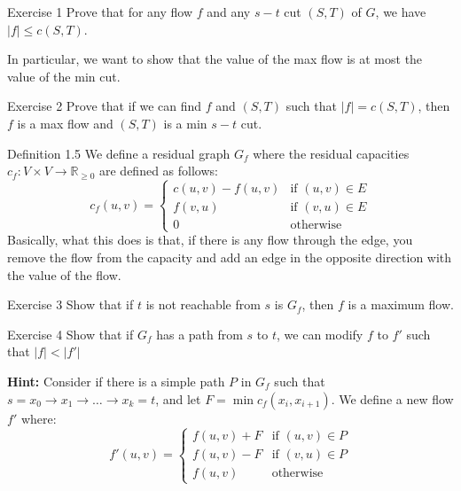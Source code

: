 \documentclass[aspectratio=169]{beamer}
\newcommand{\R}{\mathbb{R}}
\newcommand{\blankslides}{%
  \begin{frame}[plain]\end{frame}%
}
\begin{document}
\begin{frame}{Exercise 1}
  Prove that for any flow $f$ and any $s-t$ cut $(S,T)$ of $G$, we have $|f| \le c(S,T)$.

  \medskip
  In particular, we want to show that the value of the max flow is at most the value of the min cut.
\end{frame}
\blankslides

\begin{frame}{Exercise 2}
  Prove that if we can find $f$ and $(S,T)$ such that $|f| = c(S,T)$, then $f$ is a max flow and $(S,T)$ is a min $s-t$ cut.
\end{frame}
\blankslides

\begin{frame}{}
  \begin{block}{Definition 1.5}
    We define a residual graph $G_f$ where the residual capacities $c_f : V \times V \to \R_{\ge 0}$ are defined as follows:
    \[
      c_f(u,v) =
      \begin{cases}
        c(u,v) - f(u,v) & \text{if } (u,v) \in E\\
        f(v,u) & \text{if } (v,u) \in E\\
        0 & \text{otherwise}
      \end{cases}
    \]
    Basically, what this does is that, if there is any flow through the edge, you remove the flow from the capacity and add an edge in the opposite direction with the value of the flow.
  \end{block}
\end{frame}

\begin{frame}{Exercise 3}
  Show that if $t$ is not reachable from $s$ is $G_f$, then $f$ is a maximum flow.
\end{frame}
\blankslides

\begin{frame}{Exercise 4}
  Show that if $G_f$ has a path from $s$ to $t$, we can modify $f$ to $f'$ such that $|f| < |f'|$

  \medskip
  \textbf{Hint:} Consider if there is a simple path $P$ in $G_f$ such that $s = x_0 \to x_1 \to \dots \to x_k = t$, and let $F = \min c_f(x_i, x_{i+1})$. We define a new flow $f'$ where:
  \[
    f'(u,v) =
    \begin{cases}
      f(u,v) + F & \text{if } (u,v) \in P\\
      f(u,v) - F & \text{if } (v,u) \in P\\
      f(u,v) & \text{otherwise}
    \end{cases}
  \]
\end{frame}
\blankslides
\end{document}

